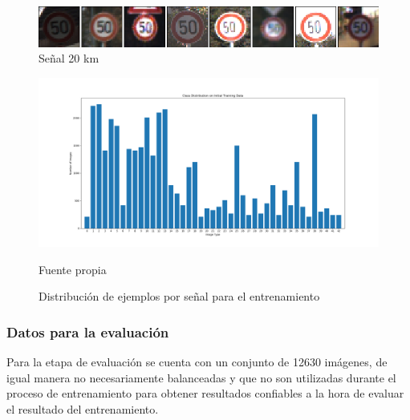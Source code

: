 \begin{figure}[H]
	\begin{center}
	\includegraphics[width=1\textwidth]{images/desarrollo/imagenes/1_(3).png}
	\end{center}
	\begin{center}
	\caption{\small{Señal 20 km}}
	\end{center}
	\vspace{-1.5em}
\end{figure}

\begin{figure}[H]
	\begin{center}
	\includegraphics[width=1\textwidth]{images/desarrollo/histograms/initial39209}
	\end{center}
	\begin{center}
	\caption{\small{Distribución de ejemplos por señal para el entrenamiento}}
	{\small{Fuente propia}}
	\end{center}
	\vspace{-1.5em}
\end{figure}



\subsubsection{Datos para la evaluación}
Para la etapa de evaluación se cuenta con un conjunto de 12630 imágenes, de igual manera no necesariamente balanceadas y que no son utilizadas durante el proceso de entrenamiento para obtener resultados confiables a la hora de evaluar el resultado del entrenamiento. 

